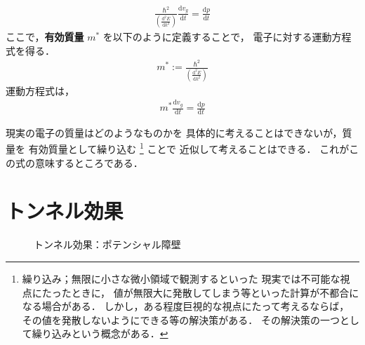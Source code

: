                    \begin{align}
                    \frac{\hbar^{2}}{
                    \displaystyle\left(\frac{\mathrm{d}^{2} E}{\mathrm{d} k^{2}}\right)}\frac{\mathrm{d} v_{g}}{\mathrm{d} t}
                    =\frac{\mathrm{d} p}{\mathrm{d} t}
                   \end{align}
                ここで，{\bf 有効質量} $m^{\ast}$ を以下のように定義することで，
                電子に対する運動方程式を得る．
                   \begin{align}
                     m^{\ast}:=\frac{\hbar^{2}}{
                     \displaystyle\left(\frac{\mathrm{d}^{2} E}{\mathrm{d} k^{2}}\right)}
                   \end{align}
                運動方程式は，
                   \begin{align}
                     m^{\ast}\frac{\mathrm{d} v_{g}}{\mathrm{d} t}
                     =\frac{\mathrm{d} p}{\mathrm{d} t}
                   \end{align}

                現実の電子の質量はどのようなものかを
                具体的に考えることはできないが，質量を
                有効質量として繰り込む
                   \footnote{
                    繰り込み；無限に小さな微小領域で観測するといった
                    現実では不可能な視点にたったときに，
                    値が無限大に発散してしまう等といった計算が不都合になる場合がある．
                    しかし，ある程度巨視的な視点にたって考えるならば，
                    その値を発散しないようにできる等の解決策がある．
                    その解決策の一つとして繰り込みという概念がある．
                   }
                ことで
                近似して考えることはできる．
                これがこの式の意味するところである．

    \section{トンネル効果}

                        \begin{figure}[hbt]
                            \begin{center}
                                \caption{トンネル効果：ポテンシャル障壁}
                                \label{fig:tonnel_ef}
                            \end{center}
                        \end{figure}

